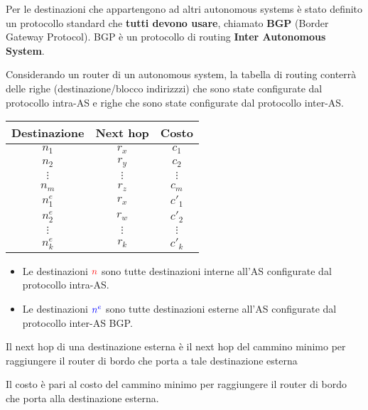 \documentclass[a4paper]{article}
\begin{document}
Per le destinazioni che appartengono ad altri autonomous systems è stato definito un
protocollo standard che \textbf{tutti devono usare}, chiamato \textbf{BGP} (Border Gateway
Protocol). BGP è un protocollo di routing \textbf{Inter Autonomous System}.

\vspace{1em}
\noindent
Considerando un router di un autonomous system, la tabella di routing conterrà delle righe
(destinazione/blocco indirizzzi) che sono state configurate dal protocollo intra-AS e
righe che sono state configurate dal protocollo inter-AS.
\begin{table}[H]
  \centering
  \begin{tabular}{c|c|c}
    Destinazione & Next hop & Costo \\
    \hline
    \color{red} \( n_1 \) &\color{red} \( r_x \) &\color{red} \( c_1 \) \\
    \color{red} \( n_2 \) &\color{red} \( r_y \) &\color{red} \( c_2 \) \\
    \color{red} \( \vdots \) &\color{red} \( \vdots \) &\color{red} \( \vdots \) \\
    \color{red} \( n_m \) &\color{red} \( r_z \) &\color{red} \( c_m \) \\
    \color{blue} \( n^e_1 \) &\color{blue} \( r_x \) &\color{blue} \( c'_1 \) \\
    \color{blue} \( n^e_2 \) &\color{blue} \( r_w \) &\color{blue} \( c'_2 \) \\
    \color{blue} \( \vdots \) &\color{blue} \( \vdots \) &\color{blue} \( \vdots \) \\
    \color{blue} \( n^e_k \) &\color{blue} \( r_k \) &\color{blue} \( c'_k \) \\
  \end{tabular}
\end{table}
\begin{itemize}
  \item Le destinazioni \( \color{red}n \) sono tutte destinazioni interne all'AS configurate dal
    protocollo intra-AS.
  \item Le destinazioni \( \color{blue}n^e \) sono tutte destinazioni esterne all'AS configurate dal
    protocollo inter-AS BGP.
\end{itemize}
Il next hop di una destinazione esterna è il next hop del cammino minimo per raggiungere
il router di bordo che porta a tale destinazione esterna

Il costo è pari al costo del cammino minimo per raggiungere il router di bordo che porta
alla destinazione esterna.
\end{document}
